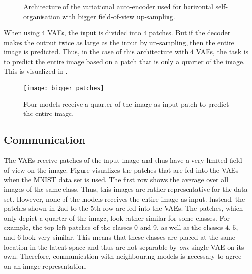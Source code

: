 \begin{figure}[h]
{
}
    \caption[Architecture of the VAE used for horizontal self-organisation with bigger field-of-view up-sampling]{Architecture of the variational auto-encoder used for horizontal self-organisation with bigger field-of-view up-sampling.}
\end{figure}

When using $4$ VAEs, the input is divided into $4$ patches. But if the decoder makes the output twice as large as the input by up-sampling, then the entire image is predicted. Thus, in the case of this architecture with $4$ VAEs, the task is to predict the entire image based on a patch that is only a quarter of the image. This is visualized in .

\begin{figure}[h]
    \centering
    \texttt{[image: bigger\_patches]}
    \caption[Reconstruction of bigger output than input patches]{Four models receive a quarter of the image as input patch to predict the entire image.}
\end{figure}


\subsection{Communication}
The VAEs receive patches of the input image and thus have a very limited field-of-view on the image.
Figure  visualizes the patches that are fed into the VAEs when the MNIST data set \cite{Lecun_Bottou_Bengio_Haffner_1998} is used.
The first row shows the average over all images of the same class. Thus, this images are rather representative for the data set.
However, none of the models receives the entire image as input. Instead, the patches shown in 2nd to the 5th row are fed into the VAEs.
The patches, which only depict a quarter of the image, look rather similar for some classes. For example, the top-left patches of the classes $0$ and $9$, as well as the classes $4$, $5$, and $6$ look very similar.
This means that these classes are placed at the same location in the latent space and thus are not separable by \emph{one} single VAE on its own.
Therefore, communication with neighbouring models is necessary to agree on an image representation.

